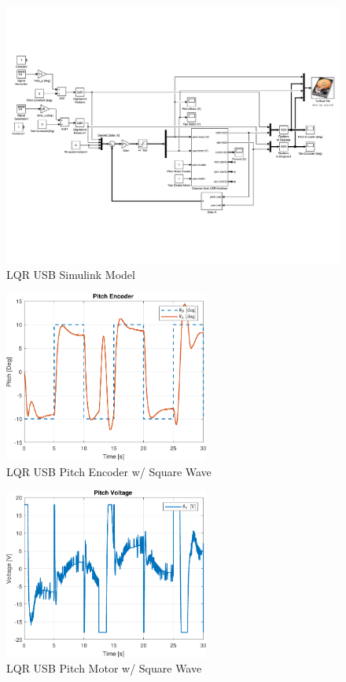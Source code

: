 \documentclass[fontsize=11pt, %
                             paper=letter, %
                             openany, %
                             captions=tableheading,
                             index=totoc,
                             hyperref]{labbook}
\begin{document}
\begin{addmargin}[0cm]{0cm}
\begin{figure}[h]
  \centering
  \includegraphics[width=1\textwidth]{figs/img/LQR_USB}
  \caption{LQR USB Simulink Model}
  \label{fig:LQR_USB}
\end{figure}

\begin{figure}[h]
  \centering
  \includegraphics[width=0.6\textwidth]{figs/matlab/LQR_USB/Pitch_Pos_LQR_USB_SQU}
  \caption{LQR USB Pitch Encoder w/ Square Wave}
  \label{fig:Pitch_Pos_LQR_USB_SQU}
\end{figure}

\begin{figure}[h]
  \centering
  \includegraphics[width=0.6\textwidth]{figs/matlab/LQR_USB/Pitch_Volt_LQR_USB_SQU}
  \caption{LQR USB Pitch Motor w/ Square Wave}
  \label{fig:Pitch_Volt_LQR_USB_SQU}
\end{figure}


\end{addmargin}
\end{document}
